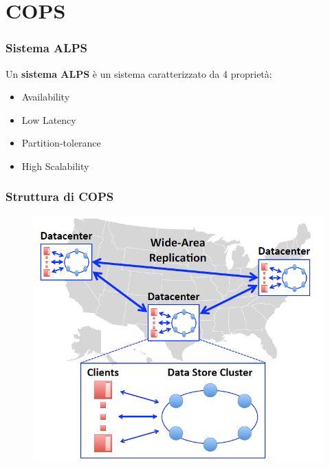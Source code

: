 \section{COPS}
\begin{frame}
\frametitle{Sistema ALPS}
	\begin{definizione}
	Un \textbf{sistema ALPS} è un sistema caratterizzato da 4 proprietà:
	\begin{itemize}
		\item<1-> Availability
		\item<2-> Low Latency
		\item<3-> Partition-tolerance
		\item<4-> High Scalability
	\end{itemize}
	\end{definizione}
\end{frame}

\begin{frame}
\frametitle{Struttura di COPS}
	\begin{figure}
		\centering
		\includegraphics[scale=0.45]{COPS/COPS1.png}
	\end{figure}
\end{frame}

